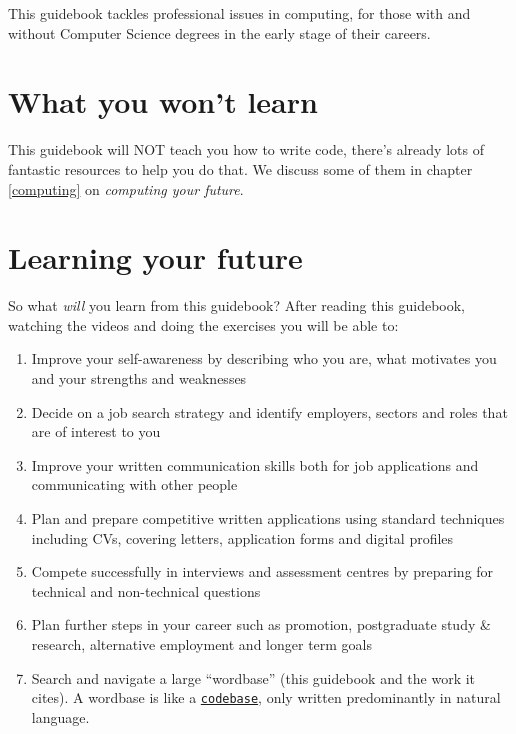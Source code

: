 \documentclass[
]{book}
\providecommand{\tightlist}{%
  \setlength{\itemsep}{0pt}\setlength{\parskip}{0pt}}
\begin{document}
This guidebook tackles professional issues in computing, for those with and without Computer Science degrees in the early stage of their careers.

\hypertarget{nilo}{%
\section{What you won't learn}\label{nilo}}

This guidebook will NOT teach you how to write code, there's already lots of fantastic resources to help you do that. We discuss some of them in chapter \ref{computing} on \emph{computing your future}.

\hypertarget{bilo}{%
\section{Learning your future}\label{bilo}}

So what \emph{will} you learn from this guidebook? After reading this guidebook, watching the videos and doing the exercises you will be able to:

\begin{enumerate}
\def\labelenumi{\arabic{enumi}.}
\tightlist
\item
  Improve your self-awareness by describing who you are, what motivates you and your strengths and weaknesses
\item
  Decide on a job search strategy and identify employers, sectors and roles that are of interest to you\\
\item
  Improve your written communication skills both for job applications and communicating with other people
\item
  Plan and prepare competitive written applications using standard techniques including CVs, covering letters, application forms and digital profiles
\item
  Compete successfully in interviews and assessment centres by preparing for technical and non-technical questions
\item
  Plan further steps in your career such as promotion, postgraduate study \& research, alternative employment and longer term goals
\item
  Search and navigate a large ``wordbase'' (this guidebook and the work it cites). A wordbase is like a \href{https://en.wikipedia.org/wiki/Codebase}{\texttt{codebase}}, only written predominantly in natural language.
\end{enumerate}
\end{document}
